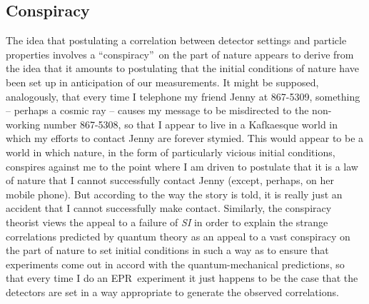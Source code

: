 \documentclass[12pt]{article}%
\begin{document}
\subsection{Conspiracy}

The idea that postulating a correlation between detector settings and particle
properties involves a \textquotedblleft conspiracy\textquotedblright\ on the
part of nature appears to derive from the idea that it amounts to postulating
that the initial conditions of nature have been set up in anticipation of our
measurements. It might be supposed, analogously, that every time I telephone
my friend Jenny at 867-5309, something -- perhaps a cosmic ray -- causes my
message to be misdirected to the non-working number 867-5308, so that I appear
to live in a Kafkaesque world in which my efforts to contact Jenny are forever
stymied. This would appear to be a world in which nature, in the form of
particularly vicious initial conditions, conspires against me to the point
where I am driven to postulate that it is a law of nature that I cannot
successfully contact Jenny (except, perhaps, on her mobile phone). But
according to the way the story is told, it is really just an accident that I
cannot successfully make contact. Similarly, the conspiracy theorist views the
appeal to a failure of \emph{SI} in order to explain the strange correlations
predicted by quantum theory as an appeal to a vast conspiracy on the part of
nature to set initial conditions in such a way as to ensure that experiments
come out in accord with the quantum-mechanical predictions, so that every time
I do an EPR\ experiment it just happens to be the case that the detectors are
set in a way appropriate to generate the observed correlations.
\end{document}
